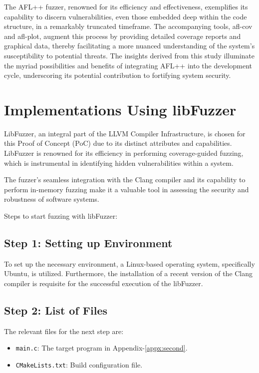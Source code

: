 The AFL++ fuzzer, renowned for its efficiency and effectiveness,
exemplifies its capability to discern vulnerabilities, even those
embedded deep within the code structure, in a remarkably truncated timeframe.
The accompanying tools, afl-cov and afl-plot, augment this process
by providing detailed coverage reports and graphical data, thereby
facilitating a more nuanced understanding of the system's susceptibility
to potential threats. The insights derived from this study illuminate the
myriad possibilities and benefits of integrating AFL++ into the development
cycle, underscoring its potential contribution to fortifying system security.

\section{Implementations Using libFuzzer}
LibFuzzer\cite{libFuzze17:online}, an integral part of the LLVM Compiler\cite{libFuzze42:online} Infrastructure,
is chosen for this Proof of Concept (PoC) due to its distinct attributes and capabilities.
LibFuzzer is renowned for its efficiency in performing coverage-guided fuzzing,
which is instrumental in identifying hidden vulnerabilities within a system\cite{fuzzingt51:online}.

The fuzzer's seamless integration with the Clang compiler\cite{ClangCLa81:online} and its capability
to perform in-memory fuzzing make it a valuable tool in assessing the security
and robustness of software systems.

Steps to start fuzzing with libFuzzer:

\subsection*{Step 1: Setting up Environment}
To set up the necessary environment, a Linux-based operating system,
specifically Ubuntu, is utilized. Furthermore, the installation of a recent
version of the Clang compiler is requisite for the successful execution of the
libFuzzer\cite{ClangCLa81:online}.

\subsection*{Step 2: List of Files}
The relevant files for the next step are:
\begin{itemize}
    \item \texttt{main.c}: The target program in Appendix-\ref{appx:second}.
    \item \texttt{CMakeLists.txt}: Build configuration file.
\end{itemize}

